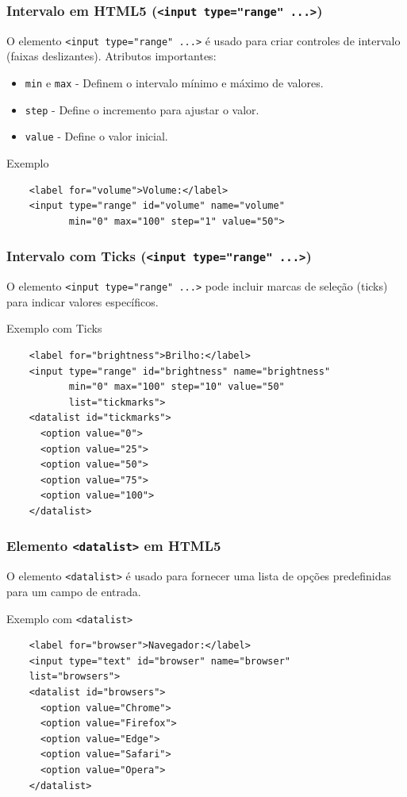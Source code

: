 \documentclass{beamer}
\begin{document}
\begin{frame}[fragile]
  \frametitle{Intervalo em HTML5 (\texttt{<input type="range" ...>})}

  O elemento \texttt{<input type="range" ...>} é usado para criar controles de intervalo (faixas deslizantes). Atributos importantes:

  \begin{itemize}
    \item \texttt{min} e \texttt{max} - Definem o intervalo mínimo e máximo de valores.
    \item \texttt{step} - Define o incremento para ajustar o valor.
    \item \texttt{value} - Define o valor inicial.
  \end{itemize}

  \begin{block}{Exemplo}
    \begin{verbatim}
    <label for="volume">Volume:</label>
    <input type="range" id="volume" name="volume"
           min="0" max="100" step="1" value="50">
    \end{verbatim}
  \end{block}
\end{frame}


\begin{frame}[fragile]
  \frametitle{Intervalo com Ticks (\texttt{<input type="range" ...>})}

  O elemento \texttt{<input type="range" ...>} pode incluir marcas de seleção (ticks) para indicar valores específicos.

  \begin{block}{Exemplo com Ticks}
    \begin{verbatim}
    <label for="brightness">Brilho:</label>
    <input type="range" id="brightness" name="brightness"
           min="0" max="100" step="10" value="50"
           list="tickmarks">
    <datalist id="tickmarks">
      <option value="0">
      <option value="25">
      <option value="50">
      <option value="75">
      <option value="100">
    </datalist>
    \end{verbatim}
  \end{block}
\end{frame}


\begin{frame}[fragile]
  \frametitle{Elemento \texttt{<datalist>} em HTML5}

  O elemento \texttt{<datalist>} é usado para fornecer uma lista de opções predefinidas para um campo de entrada.

  \begin{block}{Exemplo com \texttt{<datalist>}}
    \begin{verbatim}
    <label for="browser">Navegador:</label>
    <input type="text" id="browser" name="browser" 
    list="browsers">
    <datalist id="browsers">
      <option value="Chrome">
      <option value="Firefox">
      <option value="Edge">
      <option value="Safari">
      <option value="Opera">
    </datalist>
    \end{verbatim}
  \end{block}
\end{frame}
\end{document}

